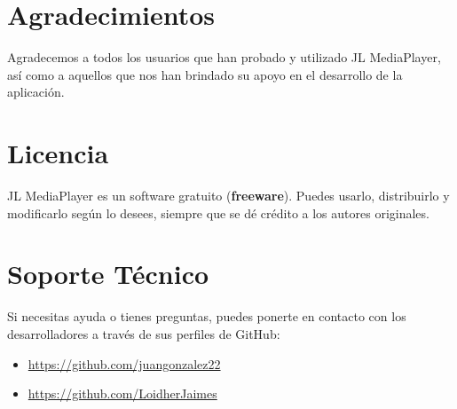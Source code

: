 \documentclass[a4paper,12pt]{article}
\begin{document}
\section*{Agradecimientos}

Agradecemos a todos los usuarios que han probado y utilizado JL MediaPlayer, así como a aquellos que nos han brindado su apoyo en el desarrollo de la aplicación.

\section*{Licencia}

JL MediaPlayer es un software gratuito (\textbf{freeware}). Puedes usarlo, distribuirlo y modificarlo según lo desees, siempre que se dé crédito a los autores originales.

\section*{Soporte Técnico}

Si necesitas ayuda o tienes preguntas, puedes ponerte en contacto con los desarrolladores a través de sus perfiles de GitHub:

\begin{itemize}
    \item \url{https://github.com/juangonzalez22}
    \item \url{https://github.com/LoidherJaimes}
\end{itemize}
\end{document}
